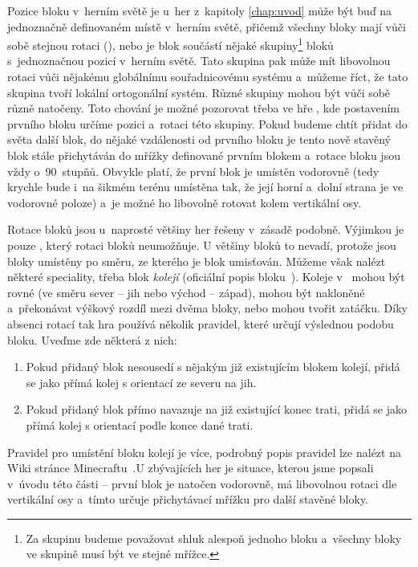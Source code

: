Pozice bloku v~herním světě je u~her z~kapitoly \ref{chap:uvod} může být buď na jednoznačně definovaném místě v~herním světě, přičemž všechny bloky mají vůči sobě stejnou rotaci (\MC{}), nebo je blok součástí nějaké skupiny\footnote{Za skupinu budeme považovat shluk alespoň jednoho bloku a~všechny bloky ve skupině musí být ve stejné mřížce.} bloků s~jednoznačnou pozicí v~herním světě. Tato skupina pak může mít libovolnou rotaci vůči nějakému globálnímu souřadnicovému systému a~můžeme říct, že tato skupina tvoří lokální ortogonální systém. Různé skupiny mohou být vůči sobě různě natočeny. Toto chování je možné pozorovat třeba ve hře \ME{}, kde postavením prvního bloku určíme pozici a~rotaci této skupiny. Pokud budeme chtít přidat do světa další blok, do nějaké vzdálenosti od prvního bloku je tento nově stavěný blok stále přichytáván do mřížky definované prvním blokem a~rotace bloku jsou vždy o~90~stupňů. Obvykle platí, že první blok je umístěn vodorovně (tedy krychle bude i~na šikmém terénu umístěna tak, že její horní a~dolní strana je ve vodorovné poloze) a~je možné ho libovolně rotovat kolem vertikální osy.

Rotace bloků jsou u~naprosté většiny her řešeny v~zásadě podobně. Výjimkou je pouze \MC{}, který rotaci bloků neumožňuje. U většiny bloků to nevadí, protože jsou bloky umístěny po směru, ze kterého je blok umisťován. Můžeme však nalézt některé speciality, třeba blok \textit{kolejí} (oficiální popis bloku~\citep{mc_rail}). Koleje v~ mohou být rovné (ve směru sever -- jih nebo východ -- západ), mohou být nakloněné a~překonávat výškový rozdíl mezi dvěma bloky, nebo mohou tvořit zatáčku. Díky absenci rotací tak hra používá několik pravidel, které určují výslednou podobu bloku. Uveďme zde některá z nich:
\begin{enumerate}
	\item Pokud přidaný blok nesousedí s nějakým již existujícím blokem kolejí, přidá se jako přímá kolej s orientací ze severu na jih.
	\item Pokud přidaný blok přímo navazuje na již existující konec trati, přidá se jako přímá kolej s orientací podle konce dané trati.
\end{enumerate}
 Pravidel pro umístění bloku kolejí je více, podrobný popis pravidel lze nalézt na Wiki stránce Minecraftu~\citep{mc_rail}.U zbývajících her je situace, kterou jsme popsali v~úvodu této části -- první blok je natočen vodorovně, má libovolnou rotaci dle vertikální osy a~tímto určuje přichytávací mřížku pro další stavěné bloky.

